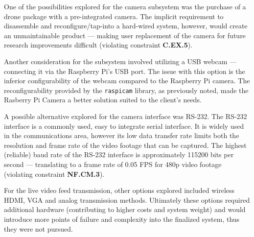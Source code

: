 One of the possibilities explored for the camera subsystem was the purchase of a drone package with a pre-integrated camera. The implicit requirement to disassemble and reconfigure/tap-into a hard-wired system, however, would create an unmaintainable product --- making user replacement of the camera for future research improvements difficult (violating constraint \textbf{C.EX.5}).

Another consideration for the subsystem involved utilizing a USB webcam --- connecting it via the Raspberry Pi's USB port. The issue with this option is the inferior configurability of the webcam compared to the Raspberry Pi camera. The reconfigurability provided by the \texttt{raspicam} library, as previously noted, made the Rasberry Pi Camera a better solution suited to the client's needs.

A possible alternative explored for the camera interface was RS-232. The RS-232 interface is a commonly used, easy to integrate serial interface. It is widely used in the communications area, however its low data transfer rate limits both the resolution and frame rate of the video footage that can be captured. The highest (reliable) baud rate of the RS-232 interface is approximately 115200 bits per second --- translating to a frame rate of 0.05 FPS for 480p video footage (violating constraint \textbf{NF.CM.3}).

For the live video feed transmission, other options explored included wireless HDMI, VGA and analog transmission methods.  Ultimately these options required additional hardware (contributing to higher costs and system weight) and would introduce more points of failure and complexity into the finalized system, thus they were not pursued.
